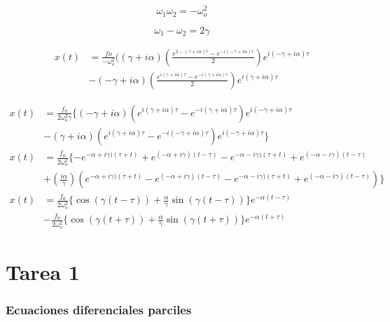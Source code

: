 \documentclass[11pt]{report}
\theoremstyle{plain}
\theoremstyle{definition}
\begin{document}
\begin{equation*}
	\omega_1\omega_2 = -\omega^2_o
\end{equation*}

\begin{equation*}
	\omega_1-\omega_2 = 2\gamma
\end{equation*}

\begin{align*}
	x(t)&=\frac{fo}{-\omega^2_o} ((\gamma +i\alpha)(\frac{e^{2-(\gamma+i\alpha)\tau}-e^{-i(-\gamma+i\alpha)\tau}}{2}) e^{i(-\gamma+i\alpha)\tau}\\
	&-(-\gamma +i\alpha)(\frac{e^{i(\gamma+i\alpha)\tau}-e^{-i(\gamma+i\alpha)\tau}}{2}) e^{i(\gamma+i\alpha)\tau}
\end{align*}

\begin{align*}
	x(t)&= \frac{f_0}{2\omega_o^2\gamma} \lbrace (-\gamma +i\alpha) (e^{i(\gamma+i\alpha)\tau} - e^{-i(\gamma +i\alpha)\tau}) e^{i(-\gamma+i\alpha)\tau}\\ 
	&- (\gamma +i\alpha) (e^{i(\gamma+i\alpha)\tau} - e^{-i(-\gamma +i\alpha)\tau}) e^{i(-\gamma+i\alpha)\tau}\rbrace\\
	x(t)&= \frac{f_0}{2\omega_o^2}\lbrace -e^{-\alpha+i\gamma)(\tau+t)}+e^{(-\alpha+i\gamma)(t-\tau)}-e^{-\alpha-i\gamma)(\tau+t)}+e^{(-\alpha-i\gamma)(t-\tau)}\\
	&+(\frac{i\alpha}{\gamma})(e^{-\alpha+i\gamma)(\tau+t)}-e^{(-\alpha+i\gamma)(t-\tau)}-e^{-\alpha-i\gamma)(\tau+t)}+e^{(-\alpha-i\gamma)(t-\tau)})\rbrace\\
	x(t)&= \frac{f_0}{2\omega_o^2}\lbrace\cos(\gamma(t-\tau))+\frac{\alpha}{\gamma}\sin(\gamma(t-\tau))\rbrace e^{-\alpha(t-\tau)}\\
	&- \frac{f_0}{2\omega_o^2}\lbrace\cos(\gamma(t+\tau))+\frac{\alpha}{\gamma} \sin(\gamma(t+\tau))\rbrace e^{-\alpha(t+\tau)}
\end{align*}

\part{Tarea 1}
\section{Ecuaciones diferenciales parciles}

\end{document}
